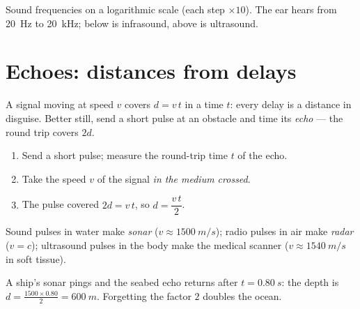 \begin{omfigure}

{\small Sound frequencies on a logarithmic scale (each step $\times 10$).
The ear hears from \qty{20}{Hz} to \qty{20}{kHz}; below is infrasound,
above is ultrasound.}
\end{omfigure}

\section{Echoes: distances from delays}

A signal moving at speed $v$ covers $d = v\,t$ in a time $t$: every delay
is a distance in disguise. Better still, send a short pulse at an
obstacle and time its \emph{echo} --- the round trip covers $2d$.

\begin{method}\label{met:g10:signals-and-waves:echo}
\begin{enumerate}
  \item Send a short pulse; measure the round-trip time $t$ of the echo.
  \item Take the speed $v$ of the signal \emph{in the medium crossed}.
  \item The pulse covered $2d = v\,t$, so $d = \dfrac{v\,t}{2}$.
\end{enumerate}
Sound pulses in water make \emph{sonar}
($v \approx \qty{1500}{m/s}$); radio pulses in air make
\emph{radar} ($v = c$); ultrasound pulses in the body make
the medical scanner ($v \approx \qty{1540}{m/s}$ in soft tissue).
\end{method}

\begin{example}[Sonar]\label{ex:g10:signals-and-waves:sonar}
A ship's sonar pings and the seabed echo returns after
$t = \qty{0.80}{s}$: the depth is
$d = \frac{1500 \times 0.80}{2} = \qty{600}{m}$. Forgetting the factor
$2$ doubles the ocean.
\end{example}

